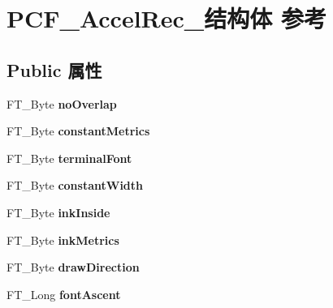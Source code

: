 \hypertarget{struct_p_c_f___accel_rec__}{}\section{P\+C\+F\+\_\+\+Accel\+Rec\+\_\+结构体 参考}
\label{struct_p_c_f___accel_rec__}
\subsection*{Public 属性}
\begin{DoxyCompactItemize}
\item 
\mbox{\label{struct_p_c_f___accel_rec___ac64fecfa13f845dfa798135f2fafe376}} 
F\+T\+\_\+\+Byte {\bfseries no\+Overlap}
\item 
\mbox{\label{struct_p_c_f___accel_rec___a206fa43a9a7f98bfdc3c785001fc1157}} 
F\+T\+\_\+\+Byte {\bfseries constant\+Metrics}
\item 
\mbox{\label{struct_p_c_f___accel_rec___ae766d252aaf93f0ddef014dd939c9574}} 
F\+T\+\_\+\+Byte {\bfseries terminal\+Font}
\item 
\mbox{\label{struct_p_c_f___accel_rec___a6b76976bea3aee5b00d0bcc460e1f5ea}} 
F\+T\+\_\+\+Byte {\bfseries constant\+Width}
\item 
\mbox{\label{struct_p_c_f___accel_rec___ae06af38645c0cff36b0b2a411ad1eca6}} 
F\+T\+\_\+\+Byte {\bfseries ink\+Inside}
\item 
\mbox{\label{struct_p_c_f___accel_rec___a82b6833fc548d25d252309da95525c31}} 
F\+T\+\_\+\+Byte {\bfseries ink\+Metrics}
\item 
\mbox{\label{struct_p_c_f___accel_rec___a3bc531152cae04868a08c1c1d8cb1224}} 
F\+T\+\_\+\+Byte {\bfseries draw\+Direction}
\item 
\mbox{\label{struct_p_c_f___accel_rec___a58fb2e3b32aa316257a41ed03f8fb9b0}} 
F\+T\+\_\+\+Long {\bfseries font\+Ascent}
\item 
\mbox{\label{struct_p_c_f___accel_rec___a51a6465885e07ff0f05181a755922a30}} 

\end{DoxyCompactItemize}
